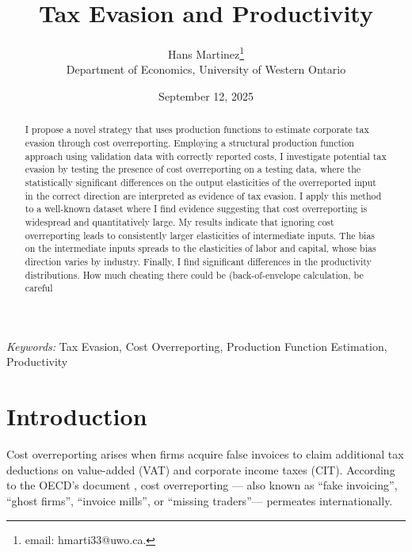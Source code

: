 \documentclass[
  12pt]{article}
\renewcommand*\contentsname{Table of contents}
\newcommand\contentsname{Table of contents}
\theoremstyle{definition}
\theoremstyle{remark}
\begin{document}
\def\spacingset#1{\renewcommand{\baselinestretch}%
{#1}\small\normalsize} \spacingset{1}



\date{September 12, 2025}
\title{\bf Tax Evasion and Productivity}
\author{
Hans Martinez\thanks{email: hmarti33@uwo.ca.}\\
Department of Economics, University of Western Ontario\\
}
\maketitle

\bigskip
\bigskip
\begin{abstract}
I propose a novel strategy that uses production functions to estimate
corporate tax evasion through cost overreporting. Employing a structural
production function approach using validation data with correctly
reported costs, I investigate potential tax evasion by testing the
presence of cost overreporting on a testing data, where the
statistically significant differences on the output elasticities of the
overreported input in the correct direction are interpreted as evidence
of tax evasion. I apply this method to a well-known dataset where I find
evidence suggesting that cost overreporting is widespread and
quantitatively large. My results indicate that ignoring cost
overreporting leads to consistently larger elasticities of intermediate
inputs. The bias on the intermediate inputs spreads to the elasticities
of labor and capital, whose bias direction varies by industry. Finally,
I find significant differences in the productivity distributions. How
much cheating there could be (back-of-envelope calculation, be careful
\end{abstract}

\noindent%
{\it Keywords:} Tax Evasion, Cost Overreporting, Production Function
Estimation, Productivity
\vfill

\newpage
\spacingset{1.9} %

\renewcommand*\contentsname{Table of contents}
{
\hypersetup{linkcolor=}
\setcounter{tocdepth}{3}
\tableofcontents
}
\section*{Introduction}\label{introduction}

Cost overreporting arises when firms acquire false invoices to claim
additional tax deductions on value-added (VAT) and corporate income
taxes (CIT). According to the OECD's document \citet{OECD2017}, cost
overreporting --- also known as ``fake invoicing'', ``ghost firms'',
``invoice mills'', or ``missing traders''--- permeates internationally.
\end{document}
